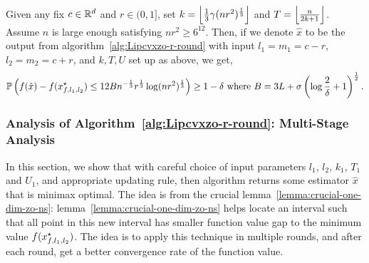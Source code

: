 \begin{corollary}
\label{corollary:zeroth-order-nonsmooth-one-round-one-dim}
Given any fix $c \in \mathbb{R}^d$ and $r \in (0, 1]$, set $k = \left\lfloor{\frac{1}{3} \gamma(nr^2)^\frac{1}{3}}\right\rfloor$
and $T = \left\lfloor{\frac{n}{2k+1}}\right\rfloor$.  Assume $n$ is large enough satisfying 
$nr^2 \geq 6^{12}$. Then, if we denote $\hat{x}$ to be the output from 
algorithm~\ref{alg:Lipcvxzo-r-round} with input $l_1 = m_1 = c-r$, 
$l_2 = m_2 = c+r$, and $k, T, U$ set up as above, we get, 
\begin{equation*}
\mathbb{P}\left(f(\hat{x}) - f(x_{f, l_1, l_2}^\star) \leq 12B n^{-\frac{1}{3}} r^\frac{1}{3}
	\log(nr^2)^\frac{1}{3}  \right) \geq 1-\delta~
\text{where}~B = 3L + \sigma \left(\log \frac{2}{\delta} + 1\right)^{\frac{1}{2}}.
\end{equation*}
\end{corollary}

\subsubsection{Analysis of Algorithm~\ref{alg:Lipcvxzo-r-round}: Multi-Stage Analysis}
In this section, we show that with careful choice of input parameters $l_1$, 
$l_2$, $k_1$, $T_1$ and $U_1$, and appropriate updating rule, then algorithm 
returns some estimator $\hat{x}$ that is minimax optimal. The idea is from the crucial 
lemma~\ref{lemma:crucial-one-dim-zo-ns}: lemma~\ref{lemma:crucial-one-dim-zo-ns}
helps locate an interval such that all point in this new interval has smaller function 
value gap to the minimum value $f(x_{f, l_1, l_2}^\star)$. The idea is to apply this 
technique in multiple rounds, and after each round, get a better convergence rate 
of the function value.  

